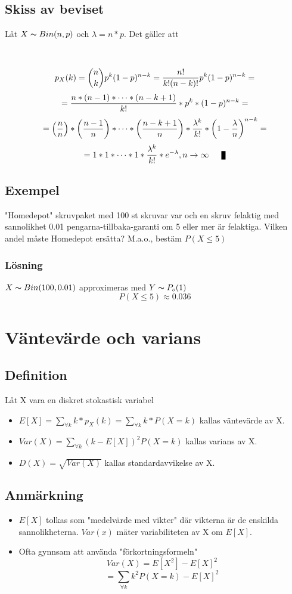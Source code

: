 \documentclass{article}
\begin{document}
\subsection{Skiss av beviset}
Låt $X\thicksim Bin(n, p)$ och $\lambda=n*p$. Det gäller att\\\\\\
$$ p_X(k) = {n \choose k}p^k(1-p)^{n-k} = \frac{n!}{k!(n-k)!}p^k(1-p)^{n-k} =$$
$$ = \frac{n*(n-1)*\dots*(n-k+1)}{k!}*p^k*(1-p)^{n-k} = $$
$$ = \left(\frac{n}{n}\right) * \left(\frac{n-1}{n} \right) * \dots * \left(\frac{n-k+1}{n} \right) * \frac{\lambda^k}{k!}  *{\left( 1- \frac{\lambda}{n} \right)}^{n-k} =$$
$$ = 1*1*\dots*1*\f{\lambda^k}{k!}*e^{-\lambda}, n\rightarrow \infty  \qed$$

\subsection{Exempel}
"Homedepot" skruvpaket med 100 st skruvar var och en skruv felaktig med sannolikhet 0.01 pengarna-tillbaka-garanti om 5 eller mer är felaktiga.
Vilken andel måste Homedepot ersätta? M.a.o., bestäm $P(X\le 5)$

\subsubsection{Lösning}
$X\thicksim Bin(100, 0.01)$ approximeras med $Y\thicksim P_o(1)$
$$ P(X\le 5) \approx 0.036 $$

\section{Väntevärde och varians}
\subsection{Definition}
Låt X vara en diskret stokastisk variabel
\begin{itemize}
  \item $ E[X] = \sum_{\forall k} k*p_X(k) =  \sum_{\forall k} k*P(X=k) $ kallas väntevärde av X.
  \item $ Var(X) = \sum_{\forall k} (k-E[X])^2P(X=k) $ kallas varians av X.
  \item $ D(X) = \sqrt{Var(X)} $ kallas standardavvikelse av X.
\end{itemize}

\subsection{Anmärkning}
\begin{itemize}
    \item $E[X]$ tolkas som "medelvärde med vikter" där vikterna är de enskilda sannolikheterna.
          $Var(x)$ mäter variabiliteten av X om $E[X]$.
    \item Ofta gynnsam att använda "förkortningsformeln"
      $$ Var(X) = E[X^2] - E[X]^2 $$
      $$ = \sum_{\forall k} k^2P(X=k) - E[X]^2  $$
\end{itemize}
\end{document}
